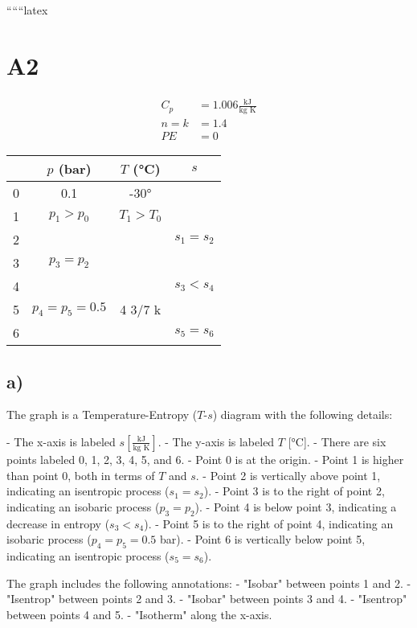 
``````latex


\section*{A2}

\begin{align*}
C_p &= 1.006 \frac{\text{kJ}}{\text{kg K}} \\
n = k &= 1.4 \\
PE &= 0
\end{align*}

\begin{tabular}{c|c|c|c}
 & $p$ (bar) & $T$ (°C) & $s$ \\
\hline
0 & 0.1 & -30° & \\
1 & $p_1 > p_0$ & $T_1 > T_0$ & \\
2 & & & $s_1 = s_2$ \\
3 & $p_3 = p_2$ & & \\
4 & & & $s_3 < s_4$ \\
5 & $p_4 = p_5 = 0.5$ & 4 3/7 k & \\
6 & & & $s_5 = s_6$ \\
\end{tabular}

\subsection*{a)}

The graph is a Temperature-Entropy ($T$-$s$) diagram with the following details:

- The x-axis is labeled $s \left[ \frac{\text{kJ}}{\text{kg K}} \right]$.
- The y-axis is labeled $T$ [°C].
- There are six points labeled 0, 1, 2, 3, 4, 5, and 6.
- Point 0 is at the origin.
- Point 1 is higher than point 0, both in terms of $T$ and $s$.
- Point 2 is vertically above point 1, indicating an isentropic process ($s_1 = s_2$).
- Point 3 is to the right of point 2, indicating an isobaric process ($p_3 = p_2$).
- Point 4 is below point 3, indicating a decrease in entropy ($s_3 < s_4$).
- Point 5 is to the right of point 4, indicating an isobaric process ($p_4 = p_5 = 0.5$ bar).
- Point 6 is vertically below point 5, indicating an isentropic process ($s_5 = s_6$).

The graph includes the following annotations:
- "Isobar" between points 1 and 2.
- "Isentrop" between points 2 and 3.
- "Isobar" between points 3 and 4.
- "Isentrop" between points 4 and 5.
- "Isotherm" along the x-axis.


